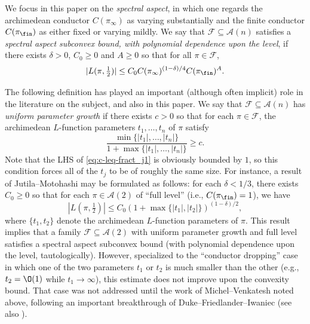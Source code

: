 We focus in this paper on the \emph{spectral aspect}, in which one regards the archimedean conductor $C(\pi_\infty)$ as varying substantially and the finite conductor $C(\pi_{\fin})$ as either fixed or varying mildly.  We say that $\mathcal{F} \subseteq \mathcal{A}(n)$ satisfies a \emph{spectral aspect subconvex bound, with polynomial dependence upon the level}, if there exists $\delta > 0$, $C_0 \geq 0$ and $A \geq 0$ so that for all $\pi \in \mathcal{F}$,
\begin{equation}\label{eq:lpi-tfrac12-leq-1}
  |L(\pi,\tfrac{1}{2})| \leq C_0 C(\pi_\infty)^{(1-\delta)/4} C(\pi_{\fin})^{A}.
\end{equation}

The following definition has played an important (although often implicit) role in the literature on the subject, and also in this paper.  We say that $\mathcal{F} \subseteq \mathcal{A}(n)$ has \emph{uniform parameter growth} if there exists $c > 0$ so that for each $\pi \in \mathcal{F}$, the archimedean $L$-function parameters $t_1,\dotsc,t_n$ of $\pi$ satisfy
\begin{equation}\label{eq:c-leq-fract_j1}
  \frac{\min \{|t_1|, \dotsc, |t_n|\} }{1 + \max \{|t_1|,\dotsc,|t_n|\}} \geq c.
\end{equation}
Note that the LHS of \eqref{eq:c-leq-fract_j1} is obviously bounded by $1$, so this condition forces all of the $t_j$ to be of roughly the same size.  For instance, a result of Jutila--Motohashi \cite{MR2233686} may be formulated as follows: for each $\delta < 1/3$, there exists $C_0 \geq 0$ so that for each $\pi \in \mathcal{A}(2)$ of ``full level'' (i.e., $C(\pi_{\fin}) = 1$), we have
\begin{equation*}
  |L(\pi,\tfrac{1}{2})| \leq C_0 (1 + \max \{|t_1|, |t_2|\})^{(1 - \delta)/2},
\end{equation*}
where $\{t_1, t_2\}$ denote the archimedean $L$-function parameters of $\pi$.  This result implies that a family $\mathcal{F} \subseteq \mathcal{A}(2)$ with uniform parameter growth and full level satisfies a spectral aspect subconvex bound (with polynomial dependence upon the level, tautologically).  However, specialized to the ``conductor dropping'' case in which one of the two parameters $t_1$ or $t_2$ is much smaller than the other (e.g., $t_2 = \O(1)$ while $t_1 \rightarrow \infty$), this estimate does not improve upon the convexity bound.  That case was not addressed until the work of Michel--Venkatesh noted above, following an important breakthrough of Duke--Friedlander--Iwaniec \cite{MR1923476} (see also \cite{MR2382859, Mi04, MR3912807}).

